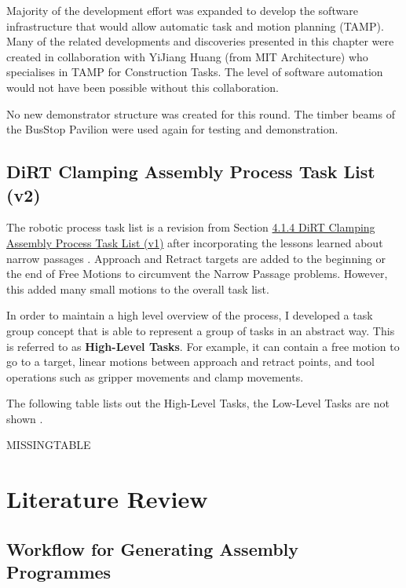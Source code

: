 Majority of the development effort was expanded to develop the software infrastructure that would allow automatic task and motion planning (TAMP). Many of the related developments and discoveries presented in this chapter were created in collaboration with YiJiang Huang (from MIT Architecture) who specialises in TAMP for Construction Tasks. The level of software automation would not have been possible without this collaboration.

No new demonstrator structure was created for this round. The timber beams of the BusStop Pavilion were used again for testing and demonstration. 

\subsection{DiRT Clamping Assembly Process Task List (v2)}
\label{subsection:exploration-3-dirt-clamping-assembly-process-task-list-v2}

The robotic process task list is a revision from Section \ul{4.1.4 DiRT Clamping Assembly Process Task List (v1)} after incorporating the lessons learned about narrow passages . Approach and Retract targets are added to the beginning or the end of Free Motions to circumvent the Narrow Passage problems. However, this added many small motions to the overall task list.

In order to maintain a high level overview of the process, I developed a task group concept that is able to represent a group of tasks in an abstract way. This is referred to as \textbf{High-Level Tasks}. For example, it can contain a free motion to go to a target, linear motions between approach and retract points, and tool operations such as gripper movements and clamp movements. 

The following table lists out the High-Level Tasks, the Low-Level Tasks are not shown . 

MISSINGTABLE

\section{Literature Review}
\label{section:exploration-3-literature-review}

\subsection{Workflow for Generating Assembly Programmes}
\label{subsection:exploration-3-workflow-for-generating-assembly-programmes}

